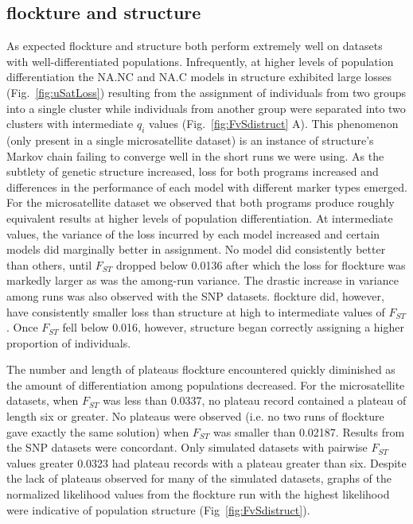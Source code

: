 \subsection*{{\sc flockture} and {\sc structure}} 
As expected {\sc flockture} and {\sc structure} both perform extremely well on datasets with
well-differentiated populations. Infrequently, at higher levels of population differentiation the 
NA.NC and NA.C models in {\sc structure} exhibited large losses (Fig.~\ref{fig:uSatLoss})
resulting from the assignment of individuals from two groups into a single cluster while 
individuals from another group were separated into two clusters
with intermediate $q_i$ values (Fig.~\ref{fig:FvSdistruct} A). This phenomenon 
(only present in a single microsatellite dataset) is an instance of {\sc structure}'s
Markov chain failing to converge well in the short runs we were using. As the subtlety of genetic structure 
increased, loss for both programs increased and differences in the performance of
each model with different marker types emerged.
For the microsatellite dataset we observed that both programs
produce roughly equivalent results at higher levels of population differentiation. At intermediate 
values, the variance of the loss incurred by each model increased and certain models did marginally
better in assignment. No model did consistently better than others, until $F_{ST}$ dropped 
below 0.0136 after which the loss for {\sc flockture} was markedly larger as was the among-run
variance. The drastic increase in variance among runs was also observed with the SNP datasets. 
{\sc flockture} did, however, have consistently smaller loss than  {\sc structure} at high to intermediate 
values of $F_{ST}$. Once $F_{ST}$ fell below 0.016, however, {\sc structure} began correctly assigning a 
higher proportion of individuals. 

The number and length of plateaus {\sc flockture} encountered quickly 
diminished as the amount of differentiation among populations decreased. For the microsatellite datasets,
when $F_{ST}$ was less than 0.0337, no plateau record
contained a plateau of length six or greater. No plateaus were observed 
(i.e. no two runs of {\sc flockture} gave exactly the same solution) when 
$F_{ST}$ was smaller than 0.02187. Results from the SNP datasets
were concordant.
Only simulated datasets with pairwise $F_{ST}$ values greater 0.0323 had plateau records with a 
plateau greater than six. Despite the lack of plateaus observed for many of the simulated datasets, 
graphs of the normalized likelihood values from the {\sc flockture} run with the highest 
likelihood were indicative of population structure (Fig~\ref{fig:FvSdistruct}).  

